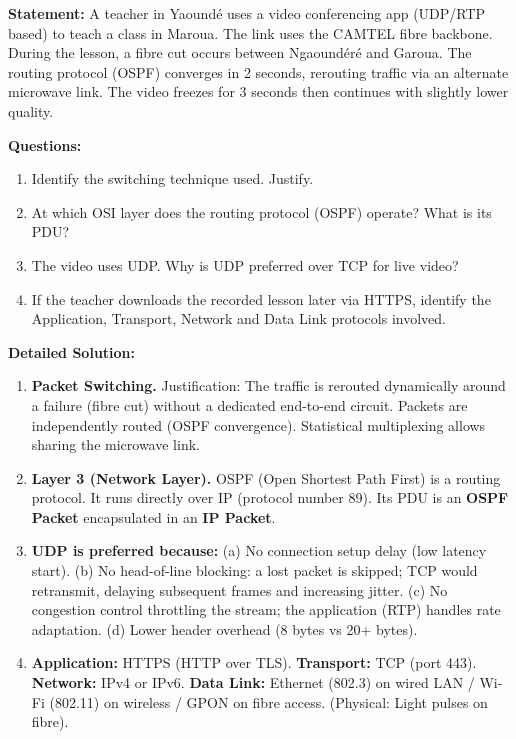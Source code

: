 \documentclass[11pt]{article}
\begin{document}
\begin{exoresolu}
\textbf{Statement:} A teacher in Yaoundé uses a video conferencing app (UDP/RTP based) to teach a class in Maroua. The link uses the CAMTEL fibre backbone. During the lesson, a fibre cut occurs between Ngaoundéré and Garoua. The routing protocol (OSPF) converges in 2 seconds, rerouting traffic via an alternate microwave link. The video freezes for 3 seconds then continues with slightly lower quality.

\textbf{Questions:}
\begin{enumerate}
    \item Identify the switching technique used. Justify.
    \item At which OSI layer does the routing protocol (OSPF) operate? What is its PDU?
    \item The video uses UDP. Why is UDP preferred over TCP for live video?
    \item If the teacher downloads the recorded lesson later via HTTPS, identify the Application, Transport, Network and Data Link protocols involved.
\end{enumerate}

\tcblower

\textbf{Detailed Solution:}
\begin{enumerate}
    \item \textbf{Packet Switching.} Justification: The traffic is rerouted dynamically around a failure (fibre cut) without a dedicated end-to-end circuit. Packets are independently routed (OSPF convergence). Statistical multiplexing allows sharing the microwave link.
    \item \textbf{Layer 3 (Network Layer).} OSPF (Open Shortest Path First) is a routing protocol. It runs directly over IP (protocol number 89). Its PDU is an \textbf{OSPF Packet} encapsulated in an \textbf{IP Packet}.
    \item \textbf{UDP is preferred because:} (a) No connection setup delay (low latency start). (b) No head-of-line blocking: a lost packet is skipped; TCP would retransmit, delaying subsequent frames and increasing jitter. (c) No congestion control throttling the stream; the application (RTP) handles rate adaptation. (d) Lower header overhead (8 bytes vs 20+ bytes).
    \item \textbf{Application:} HTTPS (HTTP over TLS). \textbf{Transport:} TCP (port 443). \textbf{Network:} IPv4 or IPv6. \textbf{Data Link:} Ethernet (802.3) on wired LAN / Wi-Fi (802.11) on wireless / GPON on fibre access. (Physical: Light pulses on fibre).
\end{enumerate}
\end{exoresolu}
\end{document}
